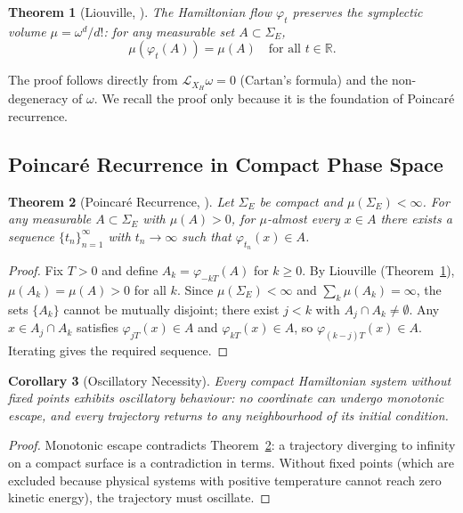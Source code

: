 \documentclass[twocolumn,10pt,a4paper]{article}
\theoremstyle{thmstyle}
\newtheorem{theorem}{Theorem}[section]
\newtheorem{corollary}[theorem]{Corollary}
\theoremstyle{definition}
\theoremstyle{remark}
\newcommand{\R}{\mathbb{R}}
\begin{document}
\begin{theorem}[Liouville, \citealp{liouville1838}]
\label{thm:liouville}
The Hamiltonian flow $\varphi_t$ preserves the symplectic volume $\mu = \omega^d / d!$: for any measurable set $A \subset \Sigma_E$,
\begin{equation}
    \mu(\varphi_t(A)) = \mu(A) \quad \text{for all } t \in \R.
\end{equation}
\end{theorem}

The proof follows directly from $\mathcal{L}_{X_H}\omega = 0$ (Cartan's formula) and the non-degeneracy of $\omega$. We recall the proof only because it is the foundation of Poincar\'e recurrence.

\subsection{Poincar\'e Recurrence in Compact Phase Space}

\begin{theorem}[Poincar\'e Recurrence, \citealp{poincare1890}]
\label{thm:poincare}
Let $\Sigma_E$ be compact and $\mu(\Sigma_E) < \infty$. For any measurable $A \subset \Sigma_E$ with $\mu(A) > 0$, for $\mu$-almost every $x \in A$ there exists a sequence $\{t_n\}_{n=1}^\infty$ with $t_n \to \infty$ such that $\varphi_{t_n}(x) \in A$.
\end{theorem}

\begin{proof}
Fix $T > 0$ and define $A_k = \varphi_{-kT}(A)$ for $k \geq 0$. By Liouville (Theorem~\ref{thm:liouville}), $\mu(A_k) = \mu(A) > 0$ for all $k$. Since $\mu(\Sigma_E) < \infty$ and $\sum_k \mu(A_k) = \infty$, the sets $\{A_k\}$ cannot be mutually disjoint; there exist $j < k$ with $A_j \cap A_k \neq \emptyset$. Any $x \in A_j \cap A_k$ satisfies $\varphi_{jT}(x) \in A$ and $\varphi_{kT}(x) \in A$, so $\varphi_{(k-j)T}(x) \in A$. Iterating gives the required sequence.
\end{proof}

\begin{corollary}[Oscillatory Necessity]
\label{cor:osc-necessity}
Every compact Hamiltonian system without fixed points exhibits oscillatory behaviour: no coordinate can undergo monotonic escape, and every trajectory returns to any neighbourhood of its initial condition.
\end{corollary}

\begin{proof}
Monotonic escape contradicts Theorem~\ref{thm:poincare}: a trajectory diverging to infinity on a compact surface is a contradiction in terms. Without fixed points (which are excluded because physical systems with positive temperature cannot reach zero kinetic energy), the trajectory must oscillate.
\end{proof}
\end{document}
